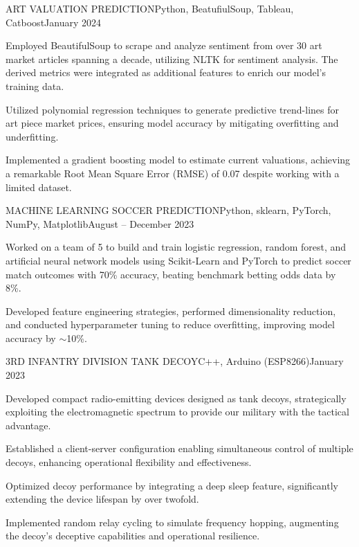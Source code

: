 \documentclass{article}
\begin{document}
\begin{flushleft}

    \vspace{3pt}

    \begin{project}{ART VALUATION PREDICTION}{}{Python, BeatufiulSoup, Tableau, Catboost}{January 2024}
        \item Employed BeautifulSoup to scrape and analyze sentiment from over 30 art market articles spanning a decade, utilizing NLTK for sentiment analysis. The derived metrics were integrated as additional features to enrich our model's training data.
        \item Utilized polynomial regression techniques to generate predictive trend-lines for art piece market prices, ensuring model accuracy by mitigating overfitting and underfitting.
        \item Implemented a gradient boosting model to estimate current valuations, achieving a remarkable Root Mean Square Error (RMSE) of 0.07 despite working with a limited dataset.
    \end{project}
    
    \begin{project}{MACHINE LEARNING SOCCER PREDICTION}{}{Python, sklearn, PyTorch, NumPy, Matplotlib}{August -- December 2023}
        \item Worked on a team of 5 to build and train logistic regression, random forest, and artificial neural network models using Scikit-Learn and PyTorch to predict soccer match outcomes with 70\% accuracy, beating benchmark betting odds data by 8\%.
        \item Developed feature engineering strategies, performed dimensionality reduction, and conducted hyperparameter tuning to reduce overfitting, improving model accuracy by $\sim$10\%.
    \end{project}

    \begin{project}{3RD INFANTRY DIVISION TANK DECOY}{}{C++, Arduino (ESP8266)}{January 2023}
        \item Developed compact radio-emitting devices designed as tank decoys, strategically exploiting the electromagnetic spectrum to provide our military with the tactical advantage.
        \item Established a client-server configuration enabling simultaneous control of multiple decoys, enhancing operational flexibility and effectiveness.
        \item Optimized decoy performance by integrating a deep sleep feature, significantly extending the device lifespan by over twofold.
        \item Implemented random relay cycling to simulate frequency hopping, augmenting the decoy's deceptive capabilities and operational resilience.
    \end{project}


\end{flushleft}
\end{document}
